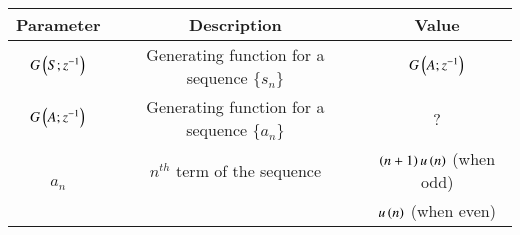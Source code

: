 \begin{tabular}{|c|c|c|}
   \hline
    \textbf{Parameter} & \textbf{Description} & \textbf{Value} \\
   \hline
    $G\left(S;z^{-1}\right)$ & Generating function for a sequence $\bigl\{ s_n \bigl\}$ & $ G\left(A;z^{-1}\right)$\\
   \hline
   $ G\left(A;z^{-1}\right)$ & Generating function for a sequence $\bigl\{ a_n \bigl\}$ & ? \\
   \hline
   \multirow{2}{*}{$a_n$} & $n^{th}$ term of the sequence & $\left(n+1\right)u\left(n\right)$ (when odd) \\
   \cline{3-3}
   & & $u\left(n\right)$ (when even) \\
   \hline
\end{tabular}
